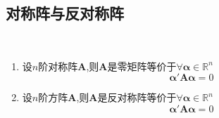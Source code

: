 \subsection{对称阵与反对称阵}
\begin{formal}
\begin{proposition}[对对称阵与反对称阵的刻画]
    \,
    \begin{enumerate}[label={\textup{(\arabic*)}}]
        \item 设$n$阶对称阵$\bm{A}$,则$\bm{A}$是零矩阵等价于$\forall \bm{\alpha}\in\mathbb{R}^n$
        \[
        \bm{\alpha}'\bm{A\alpha}=0
        \]
        \item 设$n$阶方阵$\bm{A}$,则$\bm{A}$是反对称阵等价于$\forall \bm{\alpha}\in\mathbb{R}^n$
        \[
        \bm{\alpha}'\bm{A\alpha}=0
        \]
    \end{enumerate}
\end{proposition}
\end{formal}